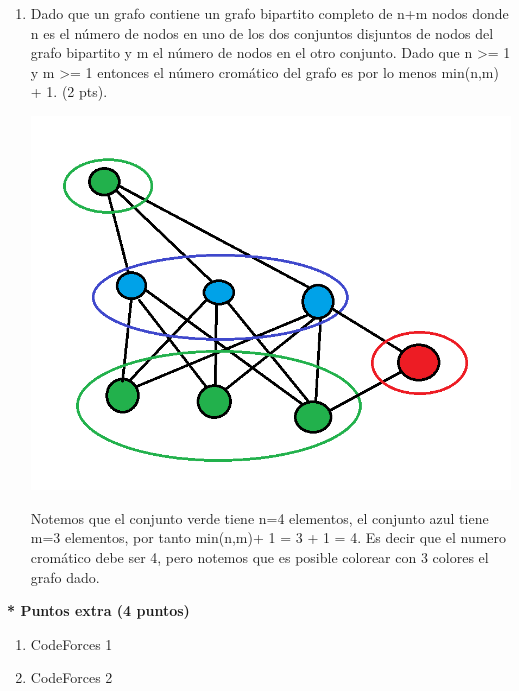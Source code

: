 \documentclass[a4paper,12pt]{article}
\begin{document}
\begin{enumerate}
\item Dado que un grafo contiene un grafo bipartito completo de n+m nodos donde n es el número de nodos en uno de los dos conjuntos disjuntos de nodos del grafo bipartito y m el número de nodos en el otro conjunto. Dado que n >= 1 y m >= 1 entonces el número cromático del grafo es por lo menos min(n,m) + 1. (2 pts).

\begin{flushleft}

\begin{center}
\par \includegraphics[scale=0.8]{p7} \par
\end{center}

\end{flushleft}

Notemos que el conjunto verde tiene n=4 elementos, el conjunto azul tiene m=3 elementos, por tanto min(n,m)+ 1 = 3 + 1 = 4. Es decir que el numero cromático debe ser 4, pero notemos que es posible colorear con 3 colores el grafo dado.

\end{enumerate}

\textbf{ * Puntos extra (4 puntos)}

\begin{enumerate}

\item CodeForces 1

\begin{flushleft}

\end{flushleft}

\item CodeForces 2

\begin{flushleft}

\end{flushleft}

\end{enumerate}
 
\end{document}
